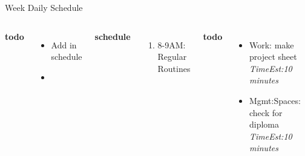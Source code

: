 \documentclass[serif, mathserif, final]{beamer}
\newcommand{\te}[1]{\textit{TimeEst:}\textit{#1}}
\begin{document}
\begin{frame}
\begin{columns}
\begin{column}{0.5\linewidth}
      \begin{block}{Week Daily Schedule} 
        \begin{columns} 
          \textbf{\small todo} \\ 
          \begin{itemize}
            \tiny \item \tiny Add in schedule
          \item \tiny 
          \end{itemize} 
          \textbf{\small schedule} \\
          \begin{enumerate} 
            \tiny \item \tiny 8-9AM: Regular Routines 
          \end{enumerate} 
          
          \textbf{\small todo} \\
          \begin{itemize}
            \tiny \item \tiny Work: make project sheet \te{10 minutes} 
          \item \tiny Mgmt:Spaces: check for diploma \te{10 minutes} 
          \end{itemize}  
          \textbf{\small schedule} 
          \begin{enumerate}
            \tiny \item \tiny 10AM - 11AM = 
          \item \tiny 11AM - 12AM = make long-term goals 
          \item \tiny 12PM - 2PM = 
            \tiny \item \tiny 2PM -3PM = 
          \item \tiny 6PM - 10PM = 
          \end{enumerate} 
          

\end{columns}
\end{block}
\end{column}
\end{columns}
\end{frame}
\end{document}
